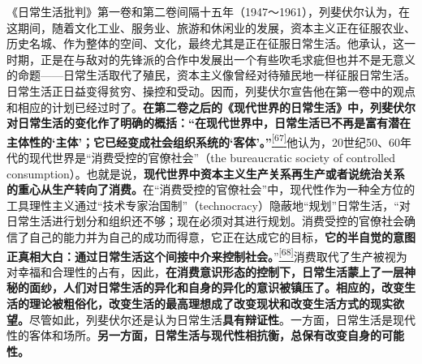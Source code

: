 \documentclass[UTF8, fontset = sourcesans, a4paper, oneside, zihao =
-4, scheme=chinese, no-math, space=true]{ctexbook}
\begin{document}
《日常生活批判》第一卷和第二卷间隔十五年（1947～1961），列斐伏尔认为，在这期间，随着文化工业、服务业、旅游和休闲业的发展，资本主义正在征服农业、历史名城、作为整体的空间、文化，最终尤其是正在征服日常生活。他承认，这一时期，正是在与敌对的先锋派的合作中发展出一个有些吹毛求疵但也并不是无意义的命题------日常生活取代了殖民，资本主义像曾经对待殖民地一样征服日常生活。日常生活正日益变得贫穷、操控和受动。因而，列斐伏尔宣告他在第一卷中的观点和相应的计划已经过时了。\textbf{在第二卷之后的《现代世界的日常生活》中，列斐伏尔对日常生活的变化作了明确的概括：``在现代世界中，日常生活已不再是富有潜在主体性的`主体'；它已经变成社会组织系统的`客体'。''}\protect\hypertarget{part0007_split_004.htmlux5cux23w67}{}{}\protect\hyperlink{part0007_split_004.htmlux5cux23m67}{\textsuperscript{{[}67{]}}}他认为，20世纪50、60年代的现代世界是``消费受控的官僚社会''（the
bureaucratic society of controlled
consumption）。也就是说，\textbf{现代世界中资本主义生产关系再生产或者说统治关系的重心从生产转向了消费。}在``消费受控的官僚社会''中，现代性作为一种全方位的工具理性主义通过``技术专家治国制''（technocracy）隐蔽地``规划''日常生活，``对日常生活进行划分和组织还不够；现在必须对其进行规划。消费受控的官僚社会确信了自己的能力并为自己的成功而得意，它正在达成它的目标，\textbf{它的半自觉的意图正真相大白：通过日常生活这个间接中介来控制社会。}''\protect\hypertarget{part0007_split_004.htmlux5cux23w68}{}{}\protect\hyperlink{part0007_split_004.htmlux5cux23m68}{\textsuperscript{{[}68{]}}}消费取代了生产被视为对幸福和合理性的占有，因此，\textbf{在消费意识形态的控制下，日常生活蒙上了一层神秘的面纱，人们对日常生活的异化和自身的异化的意识被镇压了。相应的，改变生活的理论被粗俗化，改变生活的最高理想成了改变现状和改变生活方式的现实欲望。}尽管如此，列斐伏尔还是认为日常生活\textbf{具有辩证性}。一方面，日常生活是现代性的客体和场所。\textbf{另一方面，日常生活与现代性相抗衡，总保有改变自身的可能性。}
\end{document}
